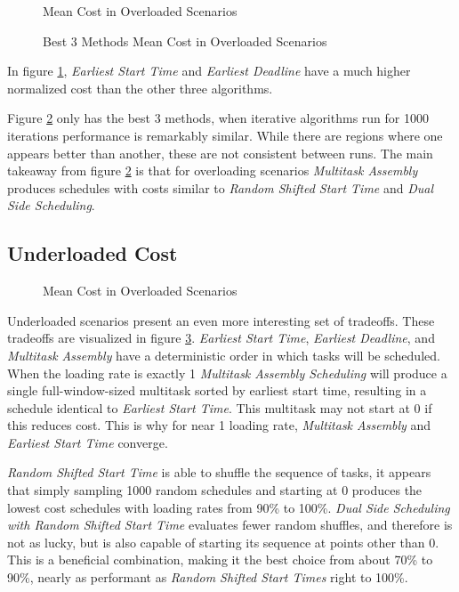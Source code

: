 \documentclass[conference]{IEEEtran}
\begin{document}
\begin{figure}[h]
	\centering
	{}
	\caption{Mean Cost in Overloaded Scenarios}
	\label{fig:overload5}
\end{figure}

\begin{figure}[h]
	\centering
	{}
	\caption{Best 3 Methods Mean Cost in Overloaded Scenarios}
	\label{fig:overload3}
\end{figure}

In figure \ref{fig:overload5}, \emph{Earliest Start Time} and \emph{Earliest Deadline} have a much higher normalized cost than the other three algorithms.

Figure \ref{fig:overload3} only has the best 3 methods, when iterative algorithms run for 1000 iterations performance is remarkably similar.
While there are regions where one appears better than another, these are not consistent between runs.
The main takeaway from figure \ref{fig:overload3} is that for overloading scenarios \emph{Multitask Assembly} produces schedules with costs similar to \emph{Random Shifted Start Time} and \emph{Dual Side Scheduling}.

\subsection{Underloaded Cost}

\begin{figure}[h]
	\centering
	{}
	\caption{Mean Cost in Overloaded Scenarios}
	\label{fig:underload5}
\end{figure}

Underloaded scenarios present an even more interesting set of tradeoffs.
These tradeoffs are visualized in figure \ref{fig:underload5}.
\emph{Earliest Start Time}, \emph{Earliest Deadline}, and \emph{Multitask Assembly} have a deterministic order in which tasks will be scheduled.
When the loading rate is exactly 1 \emph{Multitask Assembly Scheduling} will produce a single full-window-sized multitask sorted by earliest start time, resulting in a schedule identical to \emph{Earliest Start Time}.
This multitask may not start at 0 if this reduces cost. This is why for near 1 loading rate, \emph{Multitask Assembly} and \emph{Earliest Start Time} converge.

\emph{Random Shifted Start Time} is able to shuffle the sequence of tasks, it appears that simply sampling 1000 random schedules and starting at 0 produces the lowest cost schedules with loading rates from 90\% to 100\%.
\emph{Dual Side Scheduling with Random Shifted Start Time} evaluates fewer random shuffles, and therefore is not as lucky, but is also capable of starting its sequence at points other than 0.
This is a beneficial combination, making it the best choice from about 70\% to 90\%, nearly as performant as \emph{Random Shifted Start Times} right to 100\%.
\end{document}
